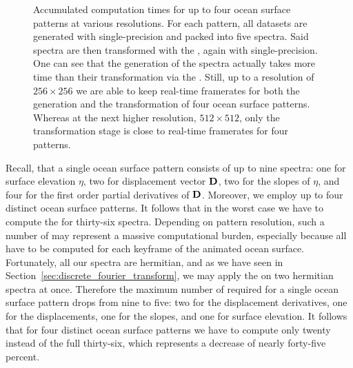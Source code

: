 \begin{figure}
\caption[Accumulated computation times for the generation and transformation
of up to four ocean surface patterns at various resolutions.]{
Accumulated computation times for up to four ocean surface patterns at
various resolutions. For each pattern, all datasets are generated with
single-precision and packed into five spectra. Said spectra are then
transformed with the \IDFT, again with single-precision. One can see that the
generation of the spectra actually takes more time than their transformation
via the \IDFT. Still, up to a resolution of $256 \times 256$ we are
able to keep real-time framerates for both the generation and the transformation
of four ocean surface patterns. Whereas at the next higher resolution,
$512 \times 512$, only the transformation stage is close to real-time
framerates for four patterns.
}
\label{fig:gen:idft}
\end{figure}
%
Recall, that a single ocean surface pattern consists of up to nine spectra:
one for surface elevation $\eta$, two for displacement vector $\mathbf{D}$,
two for the slopes of $\eta$, and four for the first order partial derivatives
of $\mathbf{D}$.
Moreover, we employ up to four distinct ocean surface patterns.
It follows that in the worst case we have to compute the
\InvDiscreteFourierTransform for thirty-six spectra. Depending on pattern
resolution, such a number of \IDFTs may represent a massive computational
burden, especially because all \IDFTs have to be computed for each keyframe
of the animated ocean surface.
Fortunately, all our spectra are hermitian, and as we have seen in
Section~\ref{sec:discrete_fourier_transform}, we may apply the
\InvDiscreteFourierTransform on two hermitian spectra at once.
Therefore the maximum number of required \IDFTs for a single ocean surface
pattern drops from nine to five: two for the displacement derivatives,
one for the displacements, one for the slopes, and one for surface elevation.
It follows that for four distinct ocean surface patterns we have to compute
only twenty \IDFTs instead of the full thirty-six, which represents a decrease
of nearly forty-five percent.

